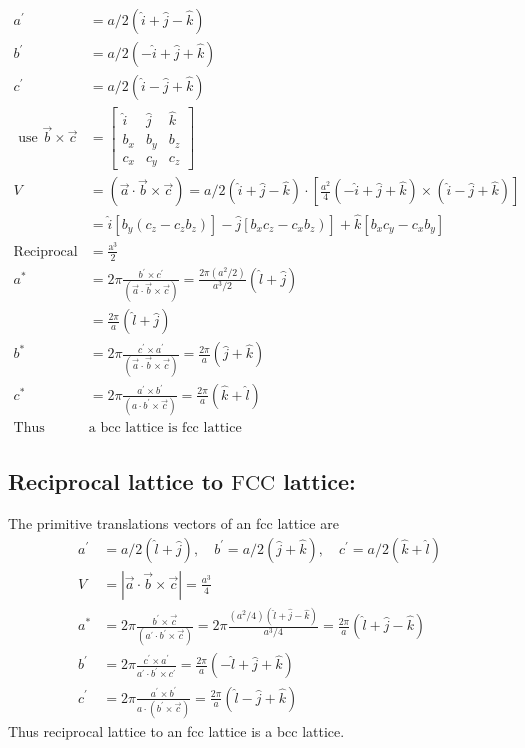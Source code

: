 \begin{align*}
a^{\prime}&=a / 2(\hat{i}+\hat{j}-\hat{k}) \\
b^{\prime}&=a / 2(-\hat{i}+\hat{j}+\hat{k}) \\
c^{\prime}&=a / 2(\hat{i}-\hat{j}+\hat{k}) \\
\text { use } \vec{b} \times \vec{c}&=\left[\begin{array}{lll}\hat{i} & \hat{j} & \hat{k} \\b_{x} & b_{y} & b_{z} \\c_{x} & c_{y} & c_{z}\end{array}\right]\\
V&=(\vec{a} \cdot \vec{b} \times \vec{c})=a / 2(\hat{i}+\hat{j}-\hat{k}) \cdot\left[\frac{a^{2}}{4}(-\hat{i}+\hat{j}+\hat{k}) \times(\hat{i}-\hat{j}+\hat{k})\right] \\
&=\left.\hat{i}\left[b_{y}\left(c_{z}-c_{z} b_{z}\right)\right]-\hat{j}\left[b_{x} c_{z}-c_{x} b_{z}\right)\right]+\hat{k}\left[b_{x} c_{y}-c_{x} b_{y}\right]\\
\text{Reciprocal lattice vector} &=\frac{\mathrm{a}^{3}}{2}\\
a^{*}&=2 \pi \frac{b^{\prime} \times c^{\prime}}{(\vec{a} \cdot \vec{b} \times \vec{c})}=\frac{2 \pi\left(a^{2} / 2\right)}{a^{3} / 2}(\hat{l}+\hat{j})\\&=\frac{2 \pi}{a}(\hat{l}+\hat{j})\\
b^{*}&=2 \pi \frac{c^{\prime} \times a^{\prime}}{(\vec{a} \cdot \vec{b} \times \vec{c})}=\frac{2 \pi}{a}(\hat{j}+\hat{k})\\
c^{*} &=2 \pi \frac{a^{\prime} \times b^{\prime}}{\left(a\cdot b^{\prime} \times \vec{c}\right)}=\frac{2 \pi}{a}(\hat{k}+\hat{l})\\
\text{Thus reciprocal lattice to }&\text{a bcc lattice is fcc lattice}
\end{align*}


\subsection{Reciprocal lattice to $\mathrm{FCC}$ lattice:}

The primitive translations vectors of an fcc lattice are
\begin{align*}
a^{\prime}&=a / 2(\hat{l}+\hat{j}), \quad b^{\prime}=a / 2(\hat{j}+\hat{k}), \quad  c^{\prime}=a / 2(\hat{k}+\hat{l})  \\
V&=|\vec{a} \cdot \vec{b} \times \vec{c}|=\frac{a^{3}}{4}\\
a^{*}&=2 \pi \frac{b^{\prime} \times \vec{c}}{\left(a^{\prime} \cdot b^{\prime} \times \vec{c}\right)}=2 \pi \frac{\left(a^{2} / 4\right)(\hat{l}+\hat{j}-\hat{k})}{a^{3} / 4}=\frac{2 \pi}{a}(\hat{l}+\hat{j}-\hat{k}) \\
b^{\prime}&=2 \pi \frac{c^{\prime} \times a^{\prime}}{a^{\prime} \cdot b^{\prime} \times c^{\prime}}=\frac{2 \pi}{a}(-\hat{l}+\hat{j}+\hat{k})\\
c^{\prime}&=2 \pi \frac{a^{\prime} \times b^{\prime}}{a \cdot\left(b^{\prime} \times \vec{c}\right)}=\frac{2 \pi}{a}(\hat{l}-\hat{j}+\hat{k})
\end{align*}
Thus reciprocal lattice to an fcc lattice is a bcc lattice.

